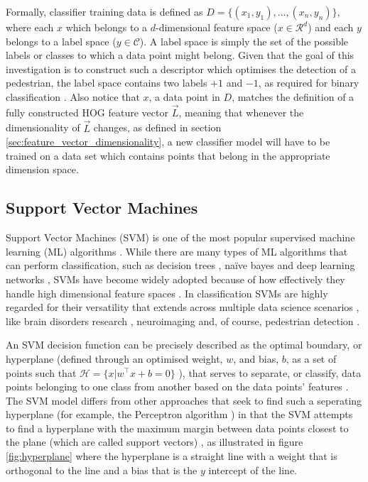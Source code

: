 Formally, classifier training data is defined as $D=\{ (x_{1},y_{1}),\dots,(x_{n},y_{n}) \}$, where each $x$ which belongs to a $d$-dimensional feature space \cite{supervised_learning} ($x\in \mathcal{R}^d$)  and each $y$ belongs to a label space \cite{supervised_learning} ($y\in \mathcal{C}$). A label space is simply the set of the possible labels or classes to which a data point might belong. Given that the goal of this investigation is to construct such a descriptor which optimises the detection of a pedestrian, the label space contains two labels $+1$ and $-1$, as required for binary classification \cite{cornell_svm}. Also notice that $x$, a data point in $D$, matches the definition of a fully constructed HOG feature vector $\vec{L}$, meaning that whenever the dimensionality of $\vec{L}$ changes, as defined in section \ref{sec:feature_vector_dimensionality}, a new classifier model will have to be trained on a data set which contains points that belong in the appropriate dimension space.

\subsection{Support Vector Machines}


Support Vector Machines (SVM) is one of the most popular supervised machine learning (ML) algorithms \cite{chang_lin_2011_libsvm} \cite{derek_2020_svm}. While there are many types of ML algorithms that can perform classification, such as decision trees \cite{cornell_decision_trees}, naïve bayes \cite{cornell_naive_bayes} and deep learning networks \cite{cornell_nn}, SVMs have become widely adopted because of how effectively they  handle high dimensional feature spaces \cite{ng_support}. In classification SVMs are highly regarded for their versatility that extends across multiple data science scenarios \cite{derek_2020_svm}, like brain disorders research \cite{derek_2020_svm}, neuroimaging \cite{svm_mri} and, of course, pedestrian detection \cite{dalal_2005_histograms}.

An SVM decision function can be precisely described as the optimal boundary, or hyperplane (defined through an optimised weight, $w$, and bias, $b$, as a set of points such that $\mathcal{H}=\{ x|w^\top x + b = 0 \}$ \cite{cornell_svm_notes}), that serves to separate, or classify, data points belonging to one class from another based on the data points' features \cite{derek_2020_svm}. The SVM model differs from other approaches that seek to find such a seperating hyperplane (for example, the Perceptron algorithm \cite{cornell_perceptron}) in that the SVM attempts to find a hyperplane with the maximum margin between data points closest to the plane (which are called support vectors) \cite{ng_support}, as illustrated in figure \ref{fig:hyperplane} where the hyperplane is a straight line with a weight that is orthogonal to the line and a bias that is the $y$ intercept of the line. 

